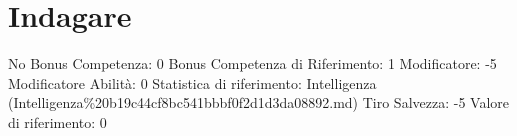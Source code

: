\section{Indagare}\label{indagare}

\begin{description}
\tightlist
\item[Tags: ABI]
No Bonus Competenza: 0 Bonus Competenza di Riferimento: 1 Modificatore:
-5 Modificatore Abilità: 0 Statistica di riferimento: Intelligenza
(Intelligenza\%20b19c44cf8bc541bbbf0f2d1d3da08892.md) Tiro Salvezza: -5
Valore di riferimento: 0
\end{description}
